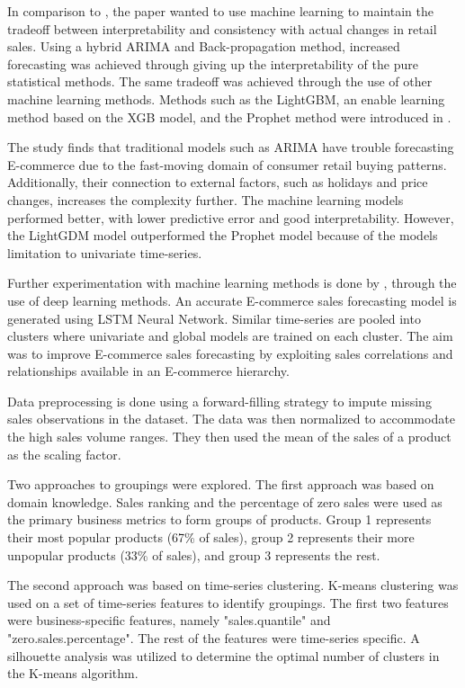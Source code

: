 In comparison to \cite{Weng2020}, the paper \cite{Bowen2020} wanted to use machine learning to maintain
the tradeoff between interpretability and consistency with actual
changes in retail sales.
Using a hybrid ARIMA and Back-propagation method, increased forecasting was achieved through
giving up the interpretability of the pure statistical methods.
The same tradeoff was achieved through the use of other machine learning methods.
Methods such as the LightGBM, an enable learning method based on the XGB model,
and the Prophet method were introduced in \citep{Zunic2020}.

The study finds that traditional models such as ARIMA have trouble forecasting E-commerce
due to the fast-moving domain of consumer retail buying patterns.
Additionally, their connection to external factors,
such as holidays and price changes, increases the complexity further.
The machine learning models performed better, with lower predictive error
and good interpretability.
However, the LightGDM model outperformed the Prophet model because of the
models limitation to univariate time-series.



Further experimentation with machine learning methods is done by \cite{Bandara2019},
through the use of deep learning methods.
An accurate E-commerce sales forecasting model is generated using LSTM  Neural Network.
Similar time-series are pooled into clusters where univariate and global models are trained on each cluster.
The aim was to improve E-commerce sales forecasting by exploiting sales correlations and relationships
available in an E-commerce hierarchy.

Data preprocessing is done using a forward-filling strategy to impute missing sales
observations in the dataset.
The data was then normalized to accommodate the high sales volume ranges.
They then used the mean of the sales of a product as the scaling factor.

Two approaches to groupings were explored.
The first approach was based on domain knowledge.
Sales ranking and the percentage of zero sales were used as the primary business metrics
to form groups of products.
Group 1 represents their most popular products (67\% of sales), group 2 represents
their more unpopular products (33\% of sales), and group 3 represents the rest.

The second approach was based on time-series clustering.
K-means clustering was used on a set of time-series features to identify groupings.
The first two features were business-specific features, namely "sales.quantile" and "zero.sales.percentage".
The rest of the features were time-series specific.
A silhouette analysis was utilized to determine the optimal number of clusters in the K-means algorithm.

